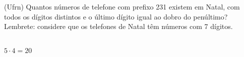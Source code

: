 \begin{ex}
(Ufrn) Quantos números de telefone com prefixo 231 existem em Natal, com todos os dígitos distintos e o último dígito igual ao dobro do penúltimo? Lembrete: considere que os telefones de Natal têm números com 7 dígitos.
  \begin{sol}
   \phantom{A}\\
   $5\cdot4=20$
  \end{sol}
\end{ex}